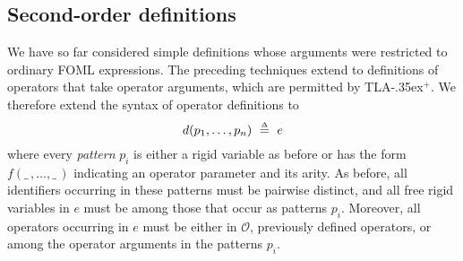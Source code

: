 \documentclass[a4paper,fleqn,envcountsame,orivec]{llncs}
\newcommand{\tlaplus}{\mbox{TLA\kern -.35ex$^+$}\xspace}
\newcommand{\FOL}[1]{\ensuremath{#1_{\textit{\scriptsize FOL}}}}
\newcommand{\OO}{\mathcal{O}}
\newcommand{\B}[1]{\framebox{\rule{0pt}{.6em}\ensuremath{\!\tlachars #1\!}}\,}
\begin{document}
%
%

\subsection{Second-order definitions}
\label{sec:second-order}

We have so far considered simple definitions whose arguments were restricted to
ordinary FOML expressions. The preceding techniques extend to definitions of
operators that take operator arguments, which are permitted by \tlaplus. We
therefore extend the syntax of operator definitions to
\[
  d(p_1, \ldots, p_n)\ \mathrel{\stackrel{\scriptscriptstyle\Delta}{=}}\ e
\]
where every \emph{pattern} $p_i$ is either a rigid variable as before or has the
form $f(\_\,,\ldots,\_\,)$ indicating an operator parameter and its arity. As
before, all identifiers occurring in these patterns must be pairwise distinct,
and all free rigid variables in $e$ must be among those that occur as
patterns $p_i$. Moreover, all operators occurring in $e$ must be either in $\OO$,
previously defined operators, or among the operator arguments in the patterns $p_i$.
\end{document}
